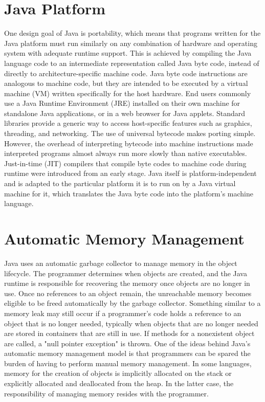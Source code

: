\section{Java Platform}
One design goal of Java is portability, which means that programs written for the Java platform must run similarly on any combination of hardware and operating system with adequate runtime support. This is achieved by compiling the Java language code to an intermediate representation called Java byte code, instead of directly to architecture-specific machine code. Java byte code instructions are analogous to machine code, but they are intended to be executed by a virtual machine (VM) written specifically for the host hardware. End users commonly use a Java Runtime Environment (JRE) installed on their own machine for standalone Java applications, or in a web browser for Java applets.
Standard libraries provide a generic way to access host-specific features such as graphics, threading, and networking.
The use of universal bytecode makes porting simple. However, the overhead of interpreting bytecode into machine instructions made interpreted programs almost always run more slowly than native executables. Just-in-time (JIT) compilers that compile byte codes to machine code during runtime were introduced from an early stage. Java itself is platform-independent and is adapted to the particular platform it is to run on by a Java virtual machine for it, which translates the Java byte code into the platform's machine language.

\section{Automatic Memory Management}
Java uses an automatic garbage collector to manage memory in the object lifecycle. The programmer determines when objects are created, and the Java runtime is responsible for recovering the memory once objects are no longer in use. Once no references to an object remain, the unreachable memory becomes eligible to be freed automatically by the garbage collector. Something similar to a memory leak may still occur if a programmer's code holds a reference to an object that is no longer needed, typically when objects that are no longer needed are stored in containers that are still in use. If methods for a nonexistent object are called, a "null pointer exception" is thrown. One of the ideas behind Java's automatic memory management model is that programmers can be spared the burden of having to perform manual memory management. In some languages, memory for the creation of objects is implicitly allocated on the stack or explicitly allocated and deallocated from the heap. In the latter case, the responsibility of managing memory resides with the programmer.
